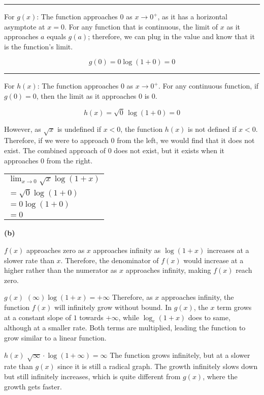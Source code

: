 \documentclass[answers,addpoints]{exam}
\begin{document}
\begin{questions}
\begin{solution}
      \hrule

      For $g(x)$: The function approaches 0 as $x \to 0^{+}$, as it has a horizontal asymptote at $x=0$. For any function that is continuous, the limit of $x$ as it approaches $a$ equals $g(a)$; therefore, we can plug in the value and know that it is the function’s limit.

      \[
        g(0) = 0\log(1+0) = 0
      \]

      \hrule

      For $h(x)$: The function approaches 0 as $x \to 0^{+}$. For any continuous function, if $g(0)=0$, then the limit as it approaches 0 is 0.

      \[
        h(x) = \sqrt{0}\,\log(1+0) = 0
      \]

      However, as $\sqrt{x}$ is undefined if $x<0$, the function $h(x)$ is not defined if $x<0$. Therefore, if we were to approach 0 from the left, we would find that it does not exist. The combined approach of 0 does not exist, but it exists when it approaches 0 from the right.

      \begin{center}
        \begin{tabular}{@{}l@{}}
          $\displaystyle \lim_{x \to 0} \sqrt{x}\log(1+x)$ \\[6pt]
          $\displaystyle = \sqrt{0}\log(1+0)$ \\[6pt]
          $\displaystyle = 0\log(1+0)$ \\[6pt]
          $\displaystyle = 0$ \\[6pt]
        \end{tabular}
      \end{center}

      \textbf{(b)}

      $f(x)$ approaches zero as $x$ approaches infinity as $\log(1+x)$ increases at a slower rate than $x$. Therefore, the denominator of $f(x)$ would increase at a higher rather than the numerator as $x$ approaches infinity, making $f(x)$ reach zero.

      $g(x)$ $(\infty)\log(1+x) = +\infty$ Therefore, as $x$ approaches infinity, the function $f(x)$ will infinitely grow without bound. In $g(x)$, the $x$ term grows at a constant slope of $1$ towards $+\infty$, while $\log_{e}(1+x)$ does to same, although at a smaller rate. Both terms are multiplied, leading the function to grow similar to a linear function.

      $h(x)$ $\sqrt{\infty}\cdot\log(1+\infty)=\infty$ The function grows infinitely, but at a slower rate than $g(x)$ since it is still a radical graph. The growth infinitely slows down but still infinitely increases, which is quite different from $g(x)$, where the growth gets faster.


\end{solution}
\end{questions}
\end{document}

